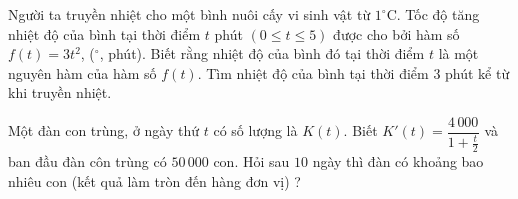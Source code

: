 \begin{bt}%
	Người ta truyền nhiệt cho một bình nuôi cấy vi sinh vật từ $1^\circ \mathrm{C}$. Tốc độ tăng nhiệt độ của bình tại  thời điểm $t$ phút $\left(0\le t\le 5\right)$ được cho bởi hàm số $f(t)=3t^2$, ($^\circ$, phút). Biết rằng nhiệt độ của bình đó tại thời điểm $t$ là một nguyên hàm của hàm số $f(t)$. Tìm nhiệt độ của bình tại thời điểm $3$ phút kể từ khi truyền nhiệt.
\end{bt}

\begin{bt}%
	Một đàn con trùng, ở ngày thứ $t$ có số lượng là  $K(t)$. Biết $K'(t)=\dfrac{4\,000}{1+\tfrac{t}{2}}$ và ban đầu đàn côn trùng có $50\,000$ con. Hỏi sau $10$ ngày thì đàn có khoảng bao nhiêu con (kết quả làm tròn đến hàng đơn vị) ?
\end{bt}


